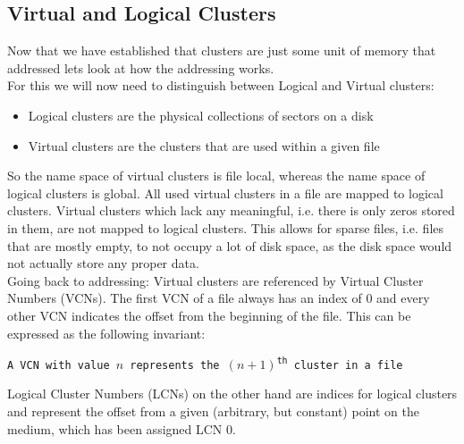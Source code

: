 \subsection{Virtual and Logical Clusters}
\label{sec:Cluster:CN}
Now that we have established that clusters are just some unit of memory that addressed lets look at how the addressing works. \\
For this we will now need to distinguish between Logical and Virtual clusters:
\begin{itemize}
	\item Logical clusters are the physical collections of sectors on a disk 
	\item Virtual clusters are the clusters that are used within a given file
\end{itemize}
So the name space of virtual clusters is file local, whereas the name space of logical clusters is global. 
All used virtual clusters in a file are mapped to logical clusters. Virtual clusters which lack any meaningful, i.e. there is only zeros stored in them,  are not mapped to logical clusters. 
This allows for sparse files, i.e. files that are mostly empty, to not occupy a lot of disk space, as the disk space would not actually store any proper data.\\
Going back to addressing: Virtual clusters are referenced by Virtual Cluster Numbers (VCNs). The first VCN of a file always has an index of $0$ and every other VCN indicates the offset from the beginning of the file. This can be expressed as the following invariant:
\begin{center}
\texttt{A VCN with value $n$ represents the $(n+1)$\textsuperscript{th} cluster in a file}\\
\end{center}
Logical Cluster Numbers (LCNs) on the other hand are indices for logical clusters and represent the offset from a given (arbitrary, but constant) point on the medium, which has been assigned LCN $0$.\cite{RUSSINOVICH_ET_AL:2012:WI}